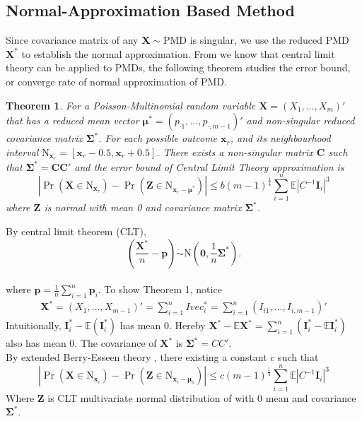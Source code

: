 \documentclass[12pt]{article}
\newcommand{\zerovec}{{\boldsymbol{0}}}
\newcommand{\Ivec}{{\boldsymbol{I}}}
\newcommand{\EE}{\mathbb{E}}
\newcommand{\Xmat}{\mathbf{X}}
\newcommand{\Cmat}{\mathbf{C}}
\newcommand{\Zmat}{\mathbf{Z}}
\newcommand{\pvec}{\boldsymbol{p}}
\newcommand{\N}{\textrm{N}}
\newcommand{\PMD}{\textrm{PMD}}
\newcommand{\Xvec}{\boldsymbol{X}}
\newcommand{\xvec}{\boldsymbol{x}}
\newcommand{\muvec}{\boldsymbol{\mu}}
\newcommand{\Sig}{\boldsymbol{\Sigma}}
\newcommand{\mvec}{\boldsymbol{\mu}}
\newtheorem{thm}{Theorem}
\begin{document}
\subsection{Normal-Approximation Based Method}
Since covariance matrix of any $\Xvec \sim \PMD$ is singular, we use the reduced $\PMD$ $\Xvec^{\ast}$ to establish the normal approximation. From   we know that central limit theory can be applied to $\PMD$s, the following theorem studies the error bound, or converge rate of normal approximation of $\PMD$.
\begin{thm}
For a Poisson-Multinomial random variable $\Xmat = (X_1,\dots,X_{m})'$ that has a reduced mean vector $\mvec^{\ast} = \left( p_{\cdot1} ,\dots,p_{\cdot,m-1}\right)'$ and non-singular reduced covariance matrix $\Sig^{\ast}$. For each possible outcome $\xvec_r$, and its neighbourhood interval $\N_{\xvec_r} = [\xvec_r-0.5, \xvec_r+0.5]$. There exists a non-singular matrix $\Cmat$ such that $\Sig^{\ast} = \Cmat\Cmat'$ and the error bound of Central Limit Theory approximation is
\begin{equation*}
    |\Pr(\Xmat \in \N_{\xvec_r}) - \Pr(\Zmat \in \N_{\xvec_r-\mvec^{\ast}})| \leq b (m-1)^{\frac{1}{4}} \sum_{i=1}^{n}\EE|C^{-1}\Ivec_{i}|^3
\end{equation*}
where $\Zmat$ is normal with mean 0 and covariance matrix $\Sig^{\ast}$.
\end{thm}
By central limit theorem (CLT),
$$\left(\frac{\Xvec^{\ast}}{n}-\pvec\right)\dot\sim \N\left(\zerovec, \frac{1}{n}\Sig^{\ast}\right).$$\\
where $\pvec = \frac{1}{n}\sum_{i=1}^{n}\pvec_i$.
To show Theorem 1, notice
\begin{align*}
    \Xvec^{\ast} = (X_1,\dots,X_{m-1})' = \sum_{i=1}^{n} Ivec_{i}^{\ast}= \sum_{i=1}^{n} (I_{i1},\dots,I_{i,m-1})'
\end{align*}
Intuitionally, $\Ivec_i^{\ast} - \EE(\Ivec_i^{\ast})$ has mean 0. Hereby $\Xvec^{\ast} - \EE \Xvec^{\ast} = \sum_{i=1}^{n} (\Ivec_i^{\ast} - \EE \Ivec_{i}^{\ast})$ also has mean 0. The covariance of $\Xvec^{\ast}$ is $\Sig^{\ast} = CC'$.\\
By extended Berry-Esseen theory \cite{raivc2019multivariate}, there existing  a constant $c$ such that
\begin{equation*}
    |\Pr\left(\Xmat \in \N_{\xvec_i}\right) - \Pr\left(\Zmat \in \N_{\xvec_i-\muvec_0} \right)| \leq c(m-1)^{\frac{1}{4}}\sum_{i=1}^{n} \EE \left|C^{-1}\Ivec_i\right|^3
\end{equation*}
Where $\Zmat$ is CLT multivariate normal distribution of with 0 mean and covariance $\Sig^{\ast}$.
\end{document}
